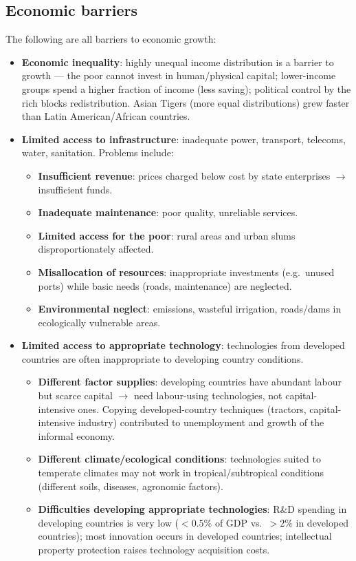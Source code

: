 \documentclass[a4paper,12pt]{article}
\begin{document}
\subsection{Economic barriers}
The following are all barriers to economic growth:
\begin{itemize}
  \item \textbf{Economic inequality}: highly unequal income distribution is a barrier to growth --- the poor cannot invest in human/physical capital; lower-income groups spend a higher fraction of income (less saving); political control by the rich blocks redistribution. Asian Tigers (more equal distributions) grew faster than Latin American/African countries.
  \item \textbf{Limited access to infrastructure}: inadequate power, transport, telecoms, water, sanitation. Problems include:
  \begin{itemize}
    \item \textbf{Insufficient revenue}: prices charged below cost by state enterprises $\to$ insufficient funds.
    \item \textbf{Inadequate maintenance}: poor quality, unreliable services.
    \item \textbf{Limited access for the poor}: rural areas and urban slums disproportionately affected.
    \item \textbf{Misallocation of resources}: inappropriate investments (e.g.\ unused ports) while basic needs (roads, maintenance) are neglected.
    \item \textbf{Environmental neglect}: emissions, wasteful irrigation, roads/dams in ecologically vulnerable areas.
  \end{itemize}
  \item \textbf{Limited access to appropriate technology}: technologies from developed countries are often inappropriate to developing country conditions.
  \begin{itemize}
    \item \textbf{Different factor supplies}: developing countries have abundant labour but scarce capital $\to$ need labour-using technologies, not capital-intensive ones. Copying developed-country techniques (tractors, capital-intensive industry) contributed to unemployment and growth of the informal economy.
    \item \textbf{Different climate/ecological conditions}: technologies suited to temperate climates may not work in tropical/subtropical conditions (different soils, diseases, agronomic factors).
    \item \textbf{Difficulties developing appropriate technologies}: R\&D spending in developing countries is very low ($<0.5\%$ of GDP vs.\ $>2\%$ in developed countries); most innovation occurs in developed countries; intellectual property protection raises technology acquisition costs.

\end{itemize}
\end{itemize}
\end{document}
